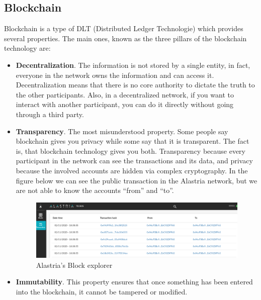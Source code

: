 \documentclass[a4paper, 12pt]{article} %
\begin{document}
    \subsection{Blockchain}
        Blockchain is a type of DLT (Distributed Ledger Technologie) which provides several properties. The main ones, known as the three pillars of the blockchain technology are:
        \begin{itemize}
            \item \textbf{Decentralization}. The information is not stored by a single entity, in fact, everyone in the network owns the information and can access it. Decentralization means that there is no core authority to dictate the truth to the other participants. Also, in a decentralized network, if you want to interact with another participant, you can do it directly without going through a third party.
            \item \textbf{Transparency}. The most misunderstood property. Some people say blockchain gives you privacy while some say that it is transparent. The fact is, that blockchain technology gives you both. Transparency because every participant in the network can see the transactions and its data, and privacy because the involved accounts are hidden via complex cryptography. In the figure below we can see the public transaction in the Alastria network, but we are not able to know the accounts “from” and “to”.
            \begin{figure}[h]
                \centering
                \includegraphics[width=1.0\textwidth]{Alastria-block-exporer.png}
                \caption{Alastria's Block explorer}
                \label{fig:alastria_block_explorer}
            \end{figure}
            \item \textbf{Immutability}. This property ensures that once something has been entered into the blockchain, it cannot be tampered or modified.
        \end{itemize}
        
\end{document}

